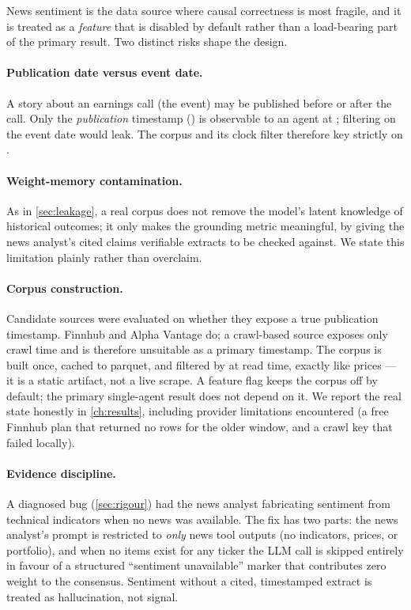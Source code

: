 News sentiment is the data source where causal correctness is most fragile, and it is
treated as a \emph{feature} that is disabled by default rather than a load-bearing part of
the primary result. Two distinct risks shape the design.

\paragraph{Publication date versus event date.} A story about an earnings call (the event)
may be published before or after the call. Only the \emph{publication} timestamp
() is observable to an agent at \tnow; filtering on the event date would
leak. The corpus and its clock filter therefore key strictly on .

\paragraph{Weight-memory contamination.} As in \cref{sec:leakage}, a real corpus does not
remove the model's latent knowledge of historical outcomes; it only makes the grounding
metric meaningful, by giving the news analyst's cited claims verifiable extracts to be
checked against. We state this limitation plainly rather than overclaim.

\paragraph{Corpus construction.} Candidate sources were evaluated on whether they expose a
true publication timestamp. Finnhub and Alpha Vantage do; a crawl-based source exposes only
crawl time and is therefore unsuitable as a primary timestamp. The corpus is built once,
cached to parquet, and filtered by  at read time, exactly like
prices --- it is a static artifact, not a live scrape. A feature flag keeps the corpus off
by default; the primary single-agent result does not depend on it. We report the real state
honestly in \cref{ch:results}, including provider limitations encountered (a free Finnhub
plan that returned no rows for the older window, and a crawl key that failed locally).

\paragraph{Evidence discipline.} A diagnosed bug (\cref{sec:rigour}) had the news analyst
fabricating sentiment from technical indicators when no news was available. The fix has two
parts: the news analyst's prompt is restricted to \emph{only} news tool outputs (no
indicators, prices, or portfolio), and when no items exist for any ticker the LLM call is
skipped entirely in favour of a structured ``sentiment unavailable'' marker that contributes
zero weight to the consensus. Sentiment without a cited, timestamped extract is treated as
hallucination, not signal.

